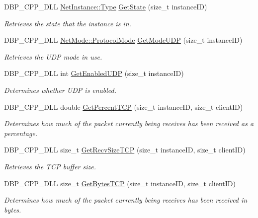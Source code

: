 \begin{DoxyCompactItemize}
DBP\_\-CPP\_\-DLL \hyperlink{class_net_instance_a0ec01a76d9b78794cfbdeab10a436cdc}{NetInstance::Type} \hyperlink{namespacemn_a8925f1bd923a24ad5f9576f02305c61e}{GetState} (size\_\-t instanceID)
\begin{DoxyCompactList}\small\item\em Retrieves the state that the instance is in. \item\end{DoxyCompactList}\item 
DBP\_\-CPP\_\-DLL \hyperlink{class_net_mode_a43cfa55ee6a4db66a8d7d6c27f766964}{NetMode::ProtocolMode} \hyperlink{namespacemn_a2d1f3ad5255ffc87da23a5fdbe965736}{GetModeUDP} (size\_\-t instanceID)
\begin{DoxyCompactList}\small\item\em Retrieves the UDP mode in use. \item\end{DoxyCompactList}\item 
DBP\_\-CPP\_\-DLL int \hyperlink{namespacemn_ac7a3b25259daf42c56da1e677a551e77}{GetEnabledUDP} (size\_\-t instanceID)
\begin{DoxyCompactList}\small\item\em Determines whether UDP is enabled. \item\end{DoxyCompactList}\item 
DBP\_\-CPP\_\-DLL double \hyperlink{namespacemn_a7413d0cbb69dc342c868d68395143dd8}{GetPercentTCP} (size\_\-t instanceID, size\_\-t clientID)
\begin{DoxyCompactList}\small\item\em Determines how much of the packet currently being receives has been received as a percentage. \item\end{DoxyCompactList}\item 
DBP\_\-CPP\_\-DLL size\_\-t \hyperlink{namespacemn_a5065424be63fbe66753762e67f4c35e0}{GetRecvSizeTCP} (size\_\-t instanceID, size\_\-t clientID)
\begin{DoxyCompactList}\small\item\em Retrieves the TCP buffer size. \item\end{DoxyCompactList}\item 
DBP\_\-CPP\_\-DLL size\_\-t \hyperlink{namespacemn_aae8cbaca06592adf7e07e7e8dbb58ff1}{GetBytesTCP} (size\_\-t instanceID, size\_\-t clientID)
\begin{DoxyCompactList}\small\item\em Determines how much of the packet currently being receives has been received in bytes. \item\end{DoxyCompactList}\item 

\end{DoxyCompactItemize}
